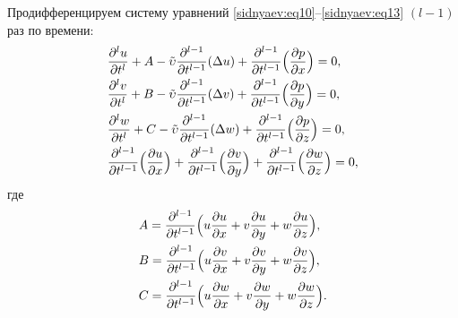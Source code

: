 Продифференцируем систему уравнений \eqref{sidnyaev:eq10}--\eqref{sidnyaev:eq13} $(l-1)$ раз
по времени:
\begin{equation}
\label{sidnyaev:eq15}
\begin{aligned}
&\frac{\partial^lu}{\partial t^l}+A-  \tilde{\upsilon}  \frac{\partial ^{l-1}}{\partial
t^{l-1}}(\Delta u)+\frac{\partial ^{l-1}}{\partial
t^{l-1}}\Bigl( \frac{\partial p}{\partial x} \Bigr)=0,\\
&\frac{\partial ^lv}{\partial t^l}+B-  \tilde{\upsilon}  \frac{\partial ^{l-1}}{\partial
t^{l-1}}(\Delta v)+\frac{\partial ^{l-1}}{\partial
t^{l-1}}\Bigl( \frac{\partial p}{\partial y} \Bigr)=0, \\
& \frac{\partial ^lw}{\partial t^l}+C-  \tilde{\upsilon}  
\frac{\partial ^{l-1}}{\partial t^{l-1}}(\Delta w)+\frac{\partial ^{l-1}}{\partial t^{l-1}}
\Bigl(\frac{\partial p}{\partial z}\Bigr)=0, \\
& 
\frac{\partial ^{l-1}}{\partial t^{l-1}}\Bigl( \frac{\partial u}{\partial x} \Bigr)+
\frac{\partial ^{l-1}}{\partial t^{l-1}}\Bigl( \frac{\partial v}{\partial y} \Bigr)+
\frac{\partial ^{l-1}}{\partial t^{l-1}}\Bigl( \frac{\partial w}{\partial z} \Bigr)=0,
\end{aligned}
\end{equation}
где
\begin{equation}
\label{sidnyaev:eq16}
\begin{aligned}
& A=\frac{\partial ^{l-1}}{\partial t^{l-1}}\Bigl( u\frac{\partial u}{\partial x}+v\frac{\partial
u}{\partial y}+w\frac{\partial u}{\partial z}\Bigr),\\
& B=\frac{\partial^{l-1}}{\partial t^{l-1}}\Bigl( u\frac{\partial
v}{\partial x}+v\frac{\partial v}{\partial y}+w\frac{\partial
v}{\partial z}\Bigr),\\
&C=\frac{\partial ^{l-1}}{\partial
t^{l-1}}\Bigl( u\frac{\partial w}{\partial x}+v\frac{\partial
w}{\partial y}+w\frac{\partial w}{\partial z} \Bigr).
\end{aligned}
\end{equation}

